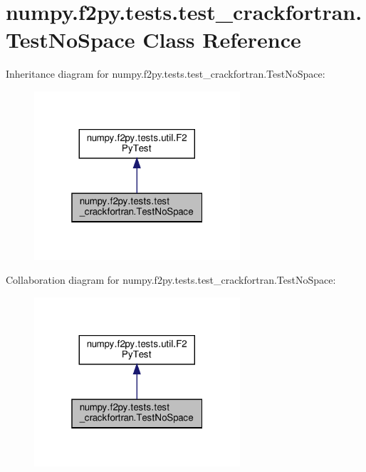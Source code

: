 \hypertarget{classnumpy_1_1f2py_1_1tests_1_1test__crackfortran_1_1TestNoSpace}{}\section{numpy.\+f2py.\+tests.\+test\+\_\+crackfortran.\+Test\+No\+Space Class Reference}
\label{classnumpy_1_1f2py_1_1tests_1_1test__crackfortran_1_1TestNoSpace}


Inheritance diagram for numpy.\+f2py.\+tests.\+test\+\_\+crackfortran.\+Test\+No\+Space\+:
\nopagebreak
\begin{figure}[H]
\begin{center}
\leavevmode
\includegraphics[width=217pt]{classnumpy_1_1f2py_1_1tests_1_1test__crackfortran_1_1TestNoSpace__inherit__graph}
\end{center}
\end{figure}


Collaboration diagram for numpy.\+f2py.\+tests.\+test\+\_\+crackfortran.\+Test\+No\+Space\+:
\nopagebreak
\begin{figure}[H]
\begin{center}
\leavevmode
\includegraphics[width=217pt]{classnumpy_1_1f2py_1_1tests_1_1test__crackfortran_1_1TestNoSpace__coll__graph}
\end{center}
\end{figure}
